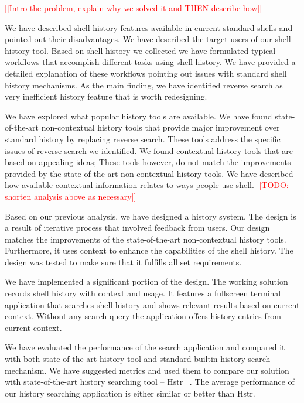 \documentclass[thesis=M,english]{FITthesis}[2012/10/20]
\newcommand{\redtext}[1]{\textcolor{red}{[[#1]]}}
\let\myCite\cite
\renewcommand\cite{\unskip~\myCite}
\begin{document}
\begin{conclusion}

\redtext{Intro the problem, explain why we solved it and THEN describe how}



We have described shell history features available in current standard shells and pointed out their disadvantages. 
We have described the target users of our shell history tool. Based on shell history we collected we have formulated typical workflows that accomplish different tasks using shell history. We have provided a detailed explanation of these workflows pointing out issues with standard shell history mechanisms. As the main finding, we have identified reverse search as very inefficient history feature that is worth redesigning.

We have explored what popular history tools are available. We have found state-of-the-art non-contextual history tools that provide major improvement over standard history by replacing reverse search. These tools address the specific issues of reverse search we identified. We found contextual history tools that are based on appealing ideas; These tools however, do not match the improvements provided by the state-of-the-art non-contextual history tools. We have described how available contextual information relates to ways people use shell. \redtext{TODO: shorten analysis above as necessary}



Based on our previous analysis, we have designed a history system. The design is a result of iterative process that involved feedback from users. Our design matches the improvements of the state-of-the-art non-contextual history tools. Furthermore, it uses context to enhance the capabilities of the shell history. The design was tested to make sure that it fulfills all set requirements. 


We have implemented a significant portion of the design. The working solution records shell history with context and usage. It features a fullscreen terminal application that searches shell history and shows relevant results based on current context. Without any search query the application offers history entries from current context. 



We have evaluated the performance of the search application and compared it with both state-of-the-art history tool and standard builtin history search mechanism. 
We have suggested metrics and used them to compare our solution with state-of-the-art history searching tool -- Hstr \cite{toolshstr}.
The average performance of our history searching application is either similar or better than Hstr. 


\end{conclusion}
\end{document}
